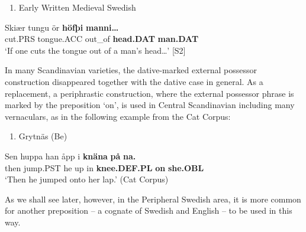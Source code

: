 \begin{enumerate} %
\item 
Early Written Medieval Swedish

\end{enumerate} %
\ea\label{}
\gll Skiær  tungu  ör  \textbf{höfþi}\textbf{  manni…}\\


cut.PRS  tongue.ACC  out\_of  \textbf{head.DAT} \textbf{man.DAT}\\ %


‘If one cuts the tongue out of a man’s head…’ [S2]
\z

In many Scandinavian varieties, the dative-marked external possessor construction disappeared together with the dative case in general. As a replacement, a periphrastic construction, where the external possessor phrase is marked by the preposition  ‘on’, is used in Central Scandinavian including many vernaculars, as in the following example from the Cat Corpus: 

\begin{enumerate} %
\item 
Grytnäs (Be) 

\end{enumerate} %
\ea\label{}
\gll Sen  huppa  han  åpp  i  \textbf{knäna} \textbf{på} \textbf{na.}\\


then  jump.PST  he  up  in  \textbf{knee.DEF.PL} \textbf{on} \textbf{she.OBL}\\ %


‘Then he jumped onto her lap.’ (Cat Corpus)
\z


As we shall see later, however, in the Peripheral Swedish area, it is more common for another preposition – a cognate of Swedish  and English  – to be used in this way.

